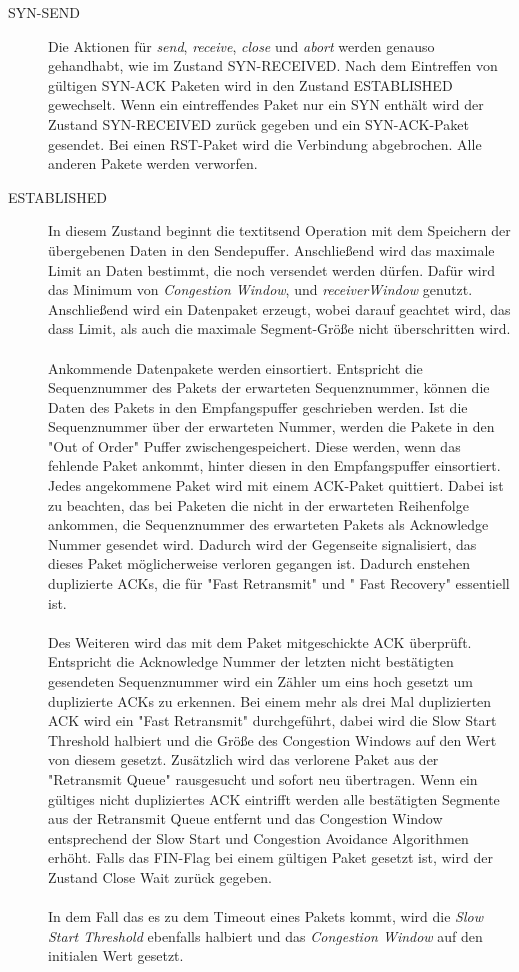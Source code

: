 \begin{description}
	
\item[SYN-SEND]
Die Aktionen für \textit{send}, \textit{receive},\textit{ close} und \textit{abort} werden genauso gehandhabt, wie im Zustand SYN-RECEIVED.
Nach dem Eintreffen von gültigen SYN-ACK Paketen wird in den Zustand ESTABLISHED gewechselt. Wenn ein eintreffendes Paket nur ein SYN enthält wird der Zustand SYN-RECEIVED zurück gegeben und ein SYN-ACK-Paket gesendet. Bei einen RST-Paket wird die Verbindung abgebrochen. Alle anderen Pakete werden verworfen.   
	
\item[ESTABLISHED]

In diesem Zustand beginnt die textit{send} Operation mit dem Speichern der übergebenen Daten in den Sendepuffer. Anschließend wird das maximale Limit an Daten bestimmt, die noch versendet werden dürfen. Dafür wird das Minimum von \textit{Congestion Window}, und \textit{receiverWindow} genutzt. Anschließend wird ein Datenpaket erzeugt, wobei darauf geachtet wird, das dass Limit, als auch die maximale Segment-Größe nicht überschritten wird. \\\\
Ankommende Datenpakete werden einsortiert. Entspricht die Sequenznummer des Pakets der erwarteten Sequenznummer, können die Daten des Pakets in den Empfangspuffer geschrieben werden. Ist die Sequenznummer über der erwarteten Nummer, werden die Pakete in den "{}Out of Order"{}  Puffer zwischengespeichert. Diese werden, wenn das fehlende Paket ankommt, hinter diesen in den Empfangspuffer einsortiert. Jedes angekommene Paket wird mit einem ACK-Paket quittiert. Dabei ist zu beachten, das bei Paketen die nicht in der erwarteten Reihenfolge ankommen, die Sequenznummer des erwarteten Pakets als Acknowledge Nummer gesendet wird. Dadurch wird der Gegenseite signalisiert, das dieses Paket möglicherweise verloren gegangen ist. Dadurch enstehen duplizierte ACKs,  die für  "{}Fast Retransmit"{} und "{} Fast Recovery"{} essentiell ist.\\\\
Des Weiteren wird das mit dem Paket mitgeschickte ACK überprüft. Entspricht die Acknowledge Nummer der letzten nicht bestätigten gesendeten Sequenznummer wird ein Zähler um eins hoch gesetzt um duplizierte ACKs zu erkennen. Bei einem mehr als drei Mal duplizierten ACK wird ein {}"Fast Retransmit"{} durchgeführt, dabei wird die Slow Start Threshold halbiert und die Größe des Congestion Windows auf den Wert von diesem gesetzt. Zusätzlich wird das verlorene Paket aus der "{}Retransmit Queue"{} rausgesucht und sofort neu übertragen. Wenn ein gültiges nicht dupliziertes ACK eintrifft werden alle bestätigten Segmente aus der Retransmit Queue entfernt und das Congestion Window entsprechend der Slow Start und Congestion Avoidance Algorithmen erhöht. Falls das FIN-Flag bei einem gültigen Paket gesetzt ist, wird der Zustand Close Wait zurück gegeben.  \\\\
In dem Fall das es zu dem Timeout eines Pakets kommt, wird die \textit{Slow Start Threshold} ebenfalls halbiert und das \textit{Congestion Window} auf den initialen Wert gesetzt. 


\end{description}
